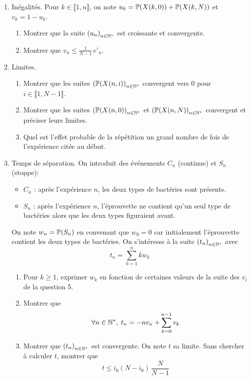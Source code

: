 \begin{enumerate}
   \item Inégalités.\newline
Pour $k\in \llbracket 1, n\rrbracket$, on note $u_k = \mathbb{P}(X(k,0)) + \mathbb{P}(X(k,N))$ et $v_k = 1 -u_k$.
\begin{enumerate}
  \item Montrer que la suite $\left( u_n\right)_{n\in \mathbb{N}^*}$ est croissante et convergente.
  \item Montrer que $v_n \leq \frac{1}{N-1}\, e'_n$.
\end{enumerate}

  \item Limites.
\begin{enumerate}
  \item Montrer que les suites $\left( \mathbb{P}(X(n,i)\right)_{n\in \mathbb{N}^*}$ convergent vers $0$ pour $i\in \llbracket 1,N-1 \rrbracket$.
  \item Montrer que les suites $\left( \mathbb{P}(X(n,0)\right)_{n\in \mathbb{N}^*}$ et $\left( \mathbb{P}(X(n,N)\right)_{n\in \mathbb{N}^*}$ convergent et préciser leurs limites. 
  \item Quel est l'effet probable de la répétition un grand nombre de fois de l'expérience citée au début.
\end{enumerate}

  \item Temps de séparation.\newline
On introduit des événements $C_n$ (continue) et $S_n$ (stoppe):
\begin{itemize}
  \item $C_n$ : après l'expérience $n$, les deux types de bactéries sont présents.
  \item $S_n$ : après l'expérience $n$, l'éprouvette ne contient qu'un seul type de bactéries alors que les deux types figuraient avant.
\end{itemize}
On note $w_n=\mathbb{P}(S_n)$ en convenant que $w_0=0$ car initialement l'éprouvette contient les deux types de bactéries. On s'intéresse à la suite $\left( t_n\right)_{n\in \mathbb{N}^*}$ avec 
\begin{displaymath}
  t_n = \sum_{k=1}^n k w_k
\end{displaymath}

\begin{enumerate}
  \item Pour $k\geq 1$, exprimer $w_k$ en fonction de certaines valeurs de la suite des $v_i$ de la question 5.
  \item Montrer que 
\begin{displaymath}
\forall n\in \mathbb{N}^*, \; t_n = -nv_n + \sum_{k=0}^{n-1}v_k 
\end{displaymath}
  \item Montrer que $\left( t_n\right)_{n\in \mathbb{N}^*}$ est convergente. On note $t$ sa limite.\newline
  Sans chercher à calculer $t$, montrer que 
\begin{displaymath}
  t\leq i_0( N-i_0) \, \frac{N}{N-1}
\end{displaymath}
\end{enumerate}

\end{enumerate}

